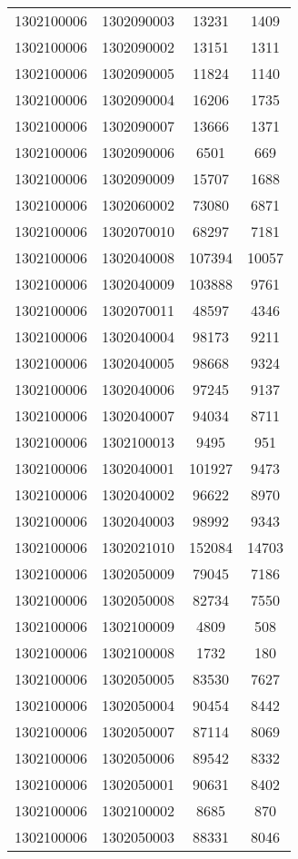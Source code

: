 \begin{longtable}[h]{llcc}
		1302100006 & 1302090003 & 13231 & 1409\\
		1302100006 & 1302090002 & 13151 & 1311\\
		1302100006 & 1302090005 & 11824 & 1140\\
		1302100006 & 1302090004 & 16206 & 1735\\
		1302100006 & 1302090007 & 13666 & 1371\\
		1302100006 & 1302090006 & 6501 & 669\\
		1302100006 & 1302090009 & 15707 & 1688\\
		1302100006 & 1302060002 & 73080 & 6871\\
		1302100006 & 1302070010 & 68297 & 7181\\
		1302100006 & 1302040008 & 107394 & 10057\\
		1302100006 & 1302040009 & 103888 & 9761\\
		1302100006 & 1302070011 & 48597 & 4346\\
		1302100006 & 1302040004 & 98173 & 9211\\
		1302100006 & 1302040005 & 98668 & 9324\\
		1302100006 & 1302040006 & 97245 & 9137\\
		1302100006 & 1302040007 & 94034 & 8711\\
		1302100006 & 1302100013 & 9495 & 951\\
		1302100006 & 1302040001 & 101927 & 9473\\
		1302100006 & 1302040002 & 96622 & 8970\\
		1302100006 & 1302040003 & 98992 & 9343\\
		1302100006 & 1302021010 & 152084 & 14703\\
		1302100006 & 1302050009 & 79045 & 7186\\
		1302100006 & 1302050008 & 82734 & 7550\\
		1302100006 & 1302100009 & 4809 & 508\\
		1302100006 & 1302100008 & 1732 & 180\\
		1302100006 & 1302050005 & 83530 & 7627\\
		1302100006 & 1302050004 & 90454 & 8442\\
		1302100006 & 1302050007 & 87114 & 8069\\
		1302100006 & 1302050006 & 89542 & 8332\\
		1302100006 & 1302050001 & 90631 & 8402\\
		1302100006 & 1302100002 & 8685 & 870\\
		1302100006 & 1302050003 & 88331 & 8046\\

\end{longtable}
